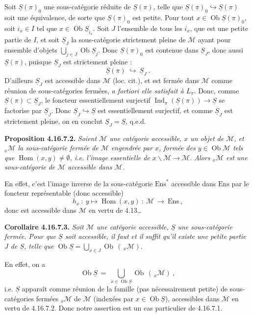 \documentclass[11pt]{article}
\newcommand{\msp}[1]{\marginpar{\footnotesize [#1]}}
\newcommand{\cM}{\mathcal{M}}
\newcommand{\Ob}{\operatorname{Ob}}
\newcommand{\Hom}{\operatorname{Hom}}
\newcommand{\Ind}{\operatorname{Ind}}
\newcommand{\uS}{\underline{S}}
\begin{document}
\msp{page 478}
Soit $\uS(\pi)_0$ une sous-catégorie réduite de $\uS(\pi)$, telle que $\uS(\pi)_0 \hookrightarrow \uS(\pi)$ soit une équivalence, de sorte que $\uS(\pi)_0$ est petite. Pour tout $x \in \Ob \uS(\pi)_0$, soit $i_x \in I$ tel que $x \in \Ob \uS_{i_x}$. Soit $J$ l'ensemble de tous les $i_x$, que est une petite partie de $I$, et soit $\uS_J$ la sous-catégorie strictement pleine de $\cM$ ayant pour ensemble d'objets $\bigcup_{j\in J} \Ob \uS_j$. Donc $\uS(\pi)_0$ est contenue dans $\uS_J$, donc aussi $\uS(\pi)$, puisque $\uS_J$ est strictement pleine : %
\[
\uS(\pi) \ \hookrightarrow\ \uS_J \ .
\]
D'ailleurs $\uS_J$ est accessible dans $\cM$ (loc. cit.), et est fermée dans $\cM$ comme réunion de sous-catégories fermées, \textit{a fortiori elle satisfait à $L_\pi$}. Donc, comme $\uS(\pi) \subset \uS_J$, le foncteur essentiellement surjectif $\Ind_\pi(\uS(\pi)) \longrightarrow \uS$ se factorise par $\uS_J$. Donc $\uS_J \hookrightarrow \uS$ est essentiellement surjectif, et comme $\uS_J$ est strictement pleine, on en conclut $\uS_J = \uS$, q.e.d.

\msp{page 479}
\textbf{Proposition 4.16.7.2.} \textit{Soient $\cM$ une catégorie accessible, $x$ un objet de $\cM$, et ${}_x\cM$ la sous-catégorie fermée de $\cM$ engendrée par $x$, formée des $y \in \Ob \cM$ tels que $\Hom(x,y) \neq \emptyset$, i.e. l'image essentielle de $x\backslash\cM \longrightarrow \cM$. Alors ${}_x\cM$ est une sous-catégorie de $\cM$ accessible dans $\cM$.}

En effet, c'est l'image inverse de la sous-catégorie $\mathrm{Ens}^*$ accessible dans $\mathrm{Ens}$ par le foncteur représentable (donc accessible)
\[
h_x \ :\ y \longmapsto \Hom(x,y) \ :\ \cM \ \longrightarrow\ \mathrm{Ens} \ ,
\]
donc est accessible dans $\cM$ en vertu de 4.13\dots

\textbf{Corollaire 4.16.7.3.} \textit{Soit $\cM$ une catégorie accessible, $\uS$ une sous-catégorie fermée. Pour que $\uS$ soit accessible, il faut et il suffit qu'il existe une \textup{petite} partie $J$ de $\uS$, telle que $\Ob \uS = \bigcup_{x\in J} \Ob\,(\,{}_x\cM)$.}

En effet, on a
\[
\Ob \uS \ =\ \bigcup_{x\in\Ob\uS} \Ob\,(\,{}_x\cM) \ ,
\]
i.e. $\uS$ apparaît comme réunion de
\msp{page 480}
la famille (pas nécessairement petite) de sous-catégories fermées ${}_x\cM$ de $\cM$ (indexées par $x \in \Ob \uS$), accessibles dans $\cM$ en vertu de 4.16.7.2. Donc notre assertion est un cas particulier de 4.16.7.1.
\end{document}
